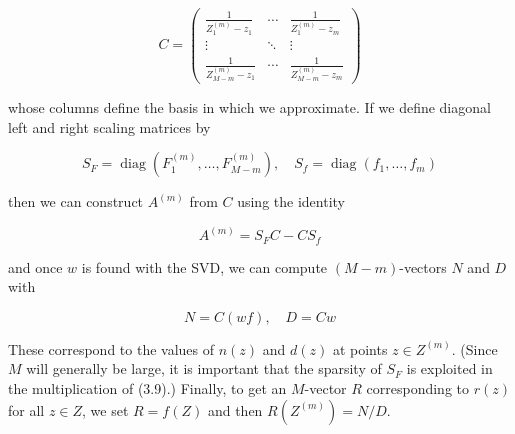 \documentclass[11pt]{article}
\theoremstyle{definition}
\begin{document}
\[
C=\left(\begin{array}{ccc}
\frac{1}{Z_{1}^{(m)}-z_{1}} & \cdots & \frac{1}{Z_{1}^{(m)}-z_{m}}  \tag{3.7}\\
\vdots & \ddots & \vdots \\
\frac{1}{Z_{M-m}^{(m)}-z_{1}} & \cdots & \frac{1}{Z_{M-m}^{(m)}-z_{m}}
\end{array}\right)
\]

whose columns define the basis in which we approximate. If we define diagonal left and right scaling matrices by


\begin{equation*}
S_{F}=\operatorname{diag}\left(F_{1}^{(m)}, \ldots, F_{M-m}^{(m)}\right), \quad S_{f}=\operatorname{diag}\left(f_{1}, \ldots, f_{m}\right) \tag{3.8}
\end{equation*}


then we can construct $A^{(m)}$ from $C$ using the identity


\begin{equation*}
A^{(m)}=S_{F} C-C S_{f} \tag{3.9}
\end{equation*}


and once $w$ is found with the SVD, we can compute $(M-m)$-vectors $N$ and $D$ with


\begin{equation*}
N=C(w f), \quad D=C w \tag{3.10}
\end{equation*}


These correspond to the values of $n(z)$ and $d(z)$ at points $z \in Z^{(m)}$. (Since $M$ will generally be large, it is important that the sparsity of $S_{F}$ is exploited in the multiplication of (3.9).) Finally, to get an $M$-vector $R$ corresponding to $r(z)$ for all $z \in Z$, we set $R=f(Z)$ and then $R\left(Z^{(m)}\right)=N / D$.
\end{document}
